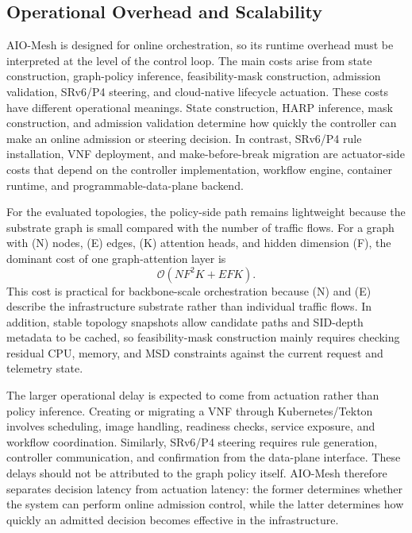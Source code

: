 \documentclass[final,5p]{elsarticle}
\begin{document}
\subsection{Operational Overhead and Scalability}
\label{subsec:overhead_scalability}
AIO-Mesh is designed for online orchestration, so its runtime overhead must be interpreted at the level of the control loop. The main costs arise from state construction, graph-policy inference, feasibility-mask construction, admission validation, SRv6/P4 steering, and cloud-native lifecycle actuation. These costs have different operational meanings. State construction, HARP inference, mask construction, and admission validation determine how quickly the controller can make an online admission or steering decision. In contrast, SRv6/P4 rule installation, VNF deployment, and make-before-break migration are actuator-side costs that depend on the controller implementation, workflow engine, container runtime, and programmable-data-plane backend.

For the evaluated topologies, the policy-side path remains lightweight because the substrate graph is small compared with the number of traffic flows. For a graph with (N) nodes, (E) edges, (K) attention heads, and hidden dimension (F), the dominant cost of one graph-attention layer is
\begin{equation}
\mathcal{O}(N F^2 K + E F K).
\end{equation}
This cost is practical for backbone-scale orchestration because (N) and (E) describe the infrastructure substrate rather than individual traffic flows. In addition, stable topology snapshots allow candidate paths and SID-depth metadata to be cached, so feasibility-mask construction mainly requires checking residual CPU, memory, and MSD constraints against the current request and telemetry state.

The larger operational delay is expected to come from actuation rather than policy inference. Creating or migrating a VNF through Kubernetes/Tekton involves scheduling, image handling, readiness checks, service exposure, and workflow coordination. Similarly, SRv6/P4 steering requires rule generation, controller communication, and confirmation from the data-plane interface. These delays should not be attributed to the graph policy itself. AIO-Mesh therefore separates decision latency from actuation latency: the former determines whether the system can perform online admission control, while the latter determines how quickly an admitted decision becomes effective in the infrastructure.
\end{document}
